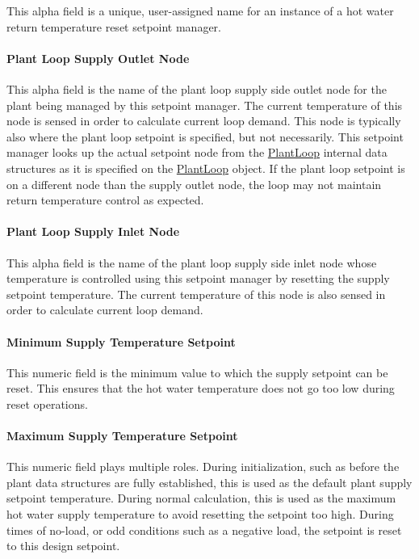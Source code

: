 This alpha field is a unique, user-assigned name for an instance of a hot water return temperature reset setpoint manager.

\paragraph{Plant Loop Supply Outlet Node}\label{plant-loop-supply-outlet-node-1}

This alpha field is the name of the plant loop supply side outlet node for the plant being managed by this setpoint manager. The current temperature of this node is sensed in order to calculate current loop demand. This node is typically also where the plant loop setpoint is specified, but not necessarily. This setpoint manager looks up the actual setpoint node from the \hyperref[plantloop]{PlantLoop} internal data structures as it is specified on the \hyperref[plantloop]{PlantLoop} object. If the plant loop setpoint is on a different node than the supply outlet node, the loop may not maintain return temperature control as expected.

\paragraph{Plant Loop Supply Inlet Node}\label{plant-loop-supply-inlet-node-1}

This alpha field is the name of the plant loop supply side inlet node whose temperature is controlled using this setpoint manager by resetting the supply setpoint temperature. The current temperature of this node is also sensed in order to calculate current loop demand.

\paragraph{Minimum Supply Temperature Setpoint}\label{minimum-supply-temperature-setpoint-1}

This numeric field is the minimum value to which the supply setpoint can be reset. This ensures that the hot water temperature does not go too low during reset operations.

\paragraph{Maximum Supply Temperature Setpoint}\label{maximum-supply-temperature-setpoint-1}

This numeric field plays multiple roles. During initialization, such as before the plant data structures are fully established, this is used as the default plant supply setpoint temperature. During normal calculation, this is used as the maximum hot water supply temperature to avoid resetting the setpoint too high. During times of no-load, or odd conditions such as a negative load, the setpoint is reset to this design setpoint.

